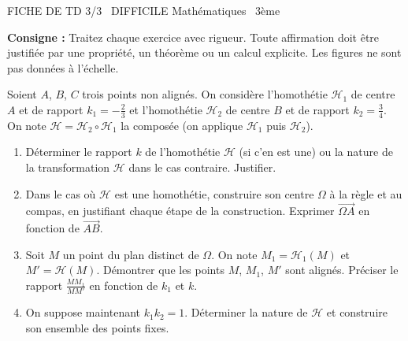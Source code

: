 \documentclass[11pt]{article}
\begin{document}
\begin{tcolorbox}[enhanced,colback=popink,colframe=popink,arc=10pt,boxrule=0pt,left=12pt,right=12pt,top=9pt,bottom=9pt]
{\color{white}\popxbold\small FICHE DE TD 3/3 \textbullet\ DIFFICILE \hfill Mathématiques \textbullet\ 3ème\par}
\end{tcolorbox}
\vspace{4pt}
\noindent \textbf{Consigne :} Traitez chaque exercice avec rigueur. Toute affirmation doit être justifiée par une propriété, un théorème ou un calcul explicite. Les figures ne sont pas données à l'échelle.

\begin{exercice}
Soient $A$, $B$, $C$ trois points non alignés. On considère l'homothétie $\mathcal{H}_1$ de centre $A$ et de rapport $k_1 = -\frac{2}{3}$ et l'homothétie $\mathcal{H}_2$ de centre $B$ et de rapport $k_2 = \frac{3}{4}$.
On note $\mathcal{H} = \mathcal{H}_2 \circ \mathcal{H}_1$ la composée (on applique $\mathcal{H}_1$ puis $\mathcal{H}_2$).
\begin{enumerate}
    \item Déterminer le rapport $k$ de l'homothétie $\mathcal{H}$ (si c'en est une) ou la nature de la transformation $\mathcal{H}$ dans le cas contraire. Justifier.
    \item Dans le cas où $\mathcal{H}$ est une homothétie, construire son centre $\Omega$ à la règle et au compas, en justifiant chaque étape de la construction. Exprimer $\overrightarrow{\Omega A}$ en fonction de $\overrightarrow{AB}$.
    \item Soit $M$ un point du plan distinct de $\Omega$. On note $M_1 = \mathcal{H}_1(M)$ et $M' = \mathcal{H}(M)$. Démontrer que les points $M$, $M_1$, $M'$ sont alignés. Préciser le rapport $\frac{MM_1}{MM'}$ en fonction de $k_1$ et $k$.
    \item On suppose maintenant $k_1k_2 = 1$. Déterminer la nature de $\mathcal{H}$ et construire son ensemble des points fixes.
\end{enumerate}
\end{exercice}
\end{document}
